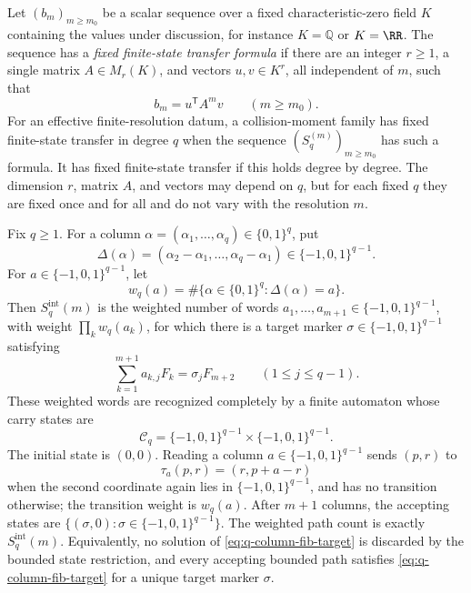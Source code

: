 \begin{definition}\label{def:fixed-finite-state-transfer}
Let \((b_m)_{m\ge m_0}\) be a scalar sequence over a fixed characteristic-zero
field \(K\) containing the values under discussion, for instance
\(K=\mathbb Q\) or \(K=\RR\).  The sequence has a \emph{fixed finite-state
transfer formula} if
there are an integer \(r\ge1\), a single matrix \(A\in M_r(K)\), and vectors
\(u,v\in K^r\), all independent of \(m\), such that
\[
  b_m=u^{\mathsf T}A^m v\qquad(m\ge m_0).
\]
For an effective finite-resolution datum, a collision-moment family has fixed
finite-state transfer in degree \(q\) when the sequence
\((S_q^{(m)})_{m\ge m_0}\) has such a formula.  It has fixed finite-state
transfer if this holds degree by degree.  The dimension \(r\), matrix \(A\), and
vectors may depend on \(q\), but for each fixed \(q\) they are fixed once and for
all and do not vary with the resolution \(m\).
\end{definition}

\begin{lemma}
\label{lem:bounded-signed-fibonacci-carry}
\label{lem:bounded-signed-fibonacci-carry-automaton}
Fix \(q\ge1\).  For a column
\(\alpha=(\alpha_1,\ldots,\alpha_q)\in\{0,1\}^q\), put
\[
  \Delta(\alpha)=(\alpha_2-
  \alpha_1,\ldots,\alpha_q-\alpha_1)
  \in\{-1,0,1\}^{q-1}.
\]
For \(a\in\{-1,0,1\}^{q-1}\), let
\[
  w_q(a)=\#\{\alpha\in\{0,1\}^q:\Delta(\alpha)=a\}.
\]
Then \(S_q^{\mathrm{int}}(m)\) is the weighted number of words
\(a_1,\ldots,a_{m+1}\in\{-1,0,1\}^{q-1}\), with weight
\(\prod_k w_q(a_k)\), for which there is a target marker
\(\sigma\in\{-1,0,1\}^{q-1}\) satisfying
\begin{equation}\label{eq:q-column-fib-target}
  \sum_{k=1}^{m+1} a_{k,j}F_k=\sigma_jF_{m+2}
  \qquad(1\le j\le q-1).
\end{equation}
These weighted words are recognized completely by a finite automaton whose carry states are
\[
  \mathcal C_q=\{-1,0,1\}^{q-1}\times\{-1,0,1\}^{q-1}.
\]
The initial state is \((0,0)\).  Reading a column
\(a\in\{-1,0,1\}^{q-1}\) sends \((p,r)\) to
\[
  \tau_a(p,r)=(r,p+a-r)
\]
when the second coordinate again lies in \(\{-1,0,1\}^{q-1}\), and has no
transition otherwise; the transition weight is \(w_q(a)\).  After
\(m+1\) columns, the accepting states are
\(\{(\sigma,0):\sigma\in\{-1,0,1\}^{q-1}\}\).  The weighted path count is
exactly \(S_q^{\mathrm{int}}(m)\).  Equivalently, no solution of
\eqref{eq:q-column-fib-target} is discarded by the bounded state restriction,
and every accepting bounded path satisfies \eqref{eq:q-column-fib-target} for a
unique target marker \(\sigma\).
\end{lemma}

